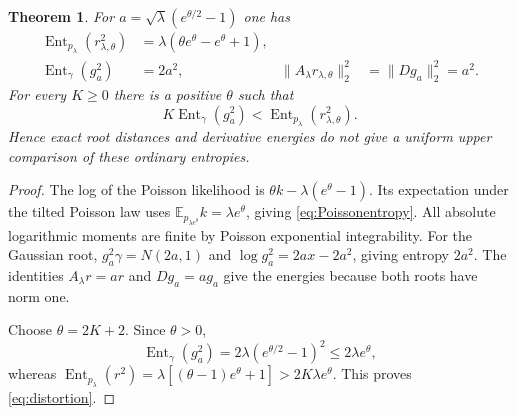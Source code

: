 \documentclass[11pt]{article}
\newtheorem{theorem}{Theorem}[section]
\newcommand{\E}{\mathbb E}\newcommand{\Ent}{\operatorname{Ent}}
\begin{document}
\begin{theorem}\label{thm:entropy}
For $a=\sqrt\lambda(e^{\theta/2}-1)$ one has
\begin{align}
 \Ent_{p_\lambda}(r_{\lambda,\theta}^2)
 &=\lambda(\theta e^\theta-e^\theta+1),\label{eq:Poissonentropy}\\
 \Ent_\gamma(g_a^2)&=2a^2,
 &\|A_\lambda r_{\lambda,\theta}\|_2^2
 &=\|Dg_a\|_2^2=a^2.\label{eq:Gaussianentropy}
\end{align}
For every $K\geq0$ there is a positive $\theta$ such that
\begin{equation}\label{eq:distortion}
 K\Ent_\gamma(g_a^2)<\Ent_{p_\lambda}(r_{\lambda,\theta}^2).
\end{equation}
Hence exact root distances and derivative energies do not give a
uniform upper comparison of these ordinary entropies.
\end{theorem}
\begin{proof}
The log of the Poisson likelihood is
$\theta k-\lambda(e^\theta-1)$. Its expectation under the tilted
Poisson law uses $\E_{p_{\lambda e^\theta}}k=\lambda e^\theta$,
giving \eqref{eq:Poissonentropy}. All absolute logarithmic moments
are finite by Poisson exponential integrability. For the Gaussian root,
$g_a^2\gamma=N(2a,1)$ and $\log g_a^2=2ax-2a^2$, giving entropy
$2a^2$. The identities $A_\lambda r=ar$ and $Dg_a=ag_a$
give the energies because both roots have norm one.

Choose $\theta=2K+2$. Since $\theta>0$,
\[
 \Ent_\gamma(g_a^2)=2\lambda(e^{\theta/2}-1)^2
 \leq2\lambda e^\theta,
\]
whereas
$\Ent_{p_\lambda}(r^2)=\lambda[(\theta-1)e^\theta+1]
>2K\lambda e^\theta$. This proves \eqref{eq:distortion}.
\end{proof}
\end{document}
